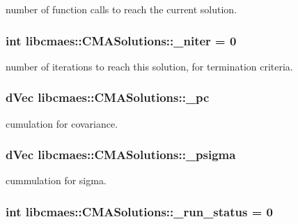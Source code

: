 number of function calls to reach the current solution. \hypertarget{classlibcmaes_1_1CMASolutions_ac4f919c1a09611ce8374edc629d3670d}{
\subsubsection[{\-\_\-niter}]{\setlength{\rightskip}{0pt plus 5cm}int libcmaes\-::\-C\-M\-A\-Solutions\-::\-\_\-niter = 0}}\label{classlibcmaes_1_1CMASolutions_ac4f919c1a09611ce8374edc629d3670d}
number of iterations to reach this solution, for termination criteria. \hypertarget{classlibcmaes_1_1CMASolutions_adc22e31da86db0140aefd132627fff74}{
\subsubsection[{\-\_\-pc}]{\setlength{\rightskip}{0pt plus 5cm}d\-Vec libcmaes\-::\-C\-M\-A\-Solutions\-::\-\_\-pc}}\label{classlibcmaes_1_1CMASolutions_adc22e31da86db0140aefd132627fff74}
cumulation for covariance. \hypertarget{classlibcmaes_1_1CMASolutions_aa39c324a7006296ee2b0c7a89713d990}{
\subsubsection[{\-\_\-psigma}]{\setlength{\rightskip}{0pt plus 5cm}d\-Vec libcmaes\-::\-C\-M\-A\-Solutions\-::\-\_\-psigma}}\label{classlibcmaes_1_1CMASolutions_aa39c324a7006296ee2b0c7a89713d990}
cummulation for sigma. \hypertarget{classlibcmaes_1_1CMASolutions_ad5b606082a773da2d5c309b3b663352a}{
\subsubsection[{\-\_\-run\-\_\-status}]{\setlength{\rightskip}{0pt plus 5cm}int libcmaes\-::\-C\-M\-A\-Solutions\-::\-\_\-run\-\_\-status = 0}}\label{classlibcmaes_1_1CMASolutions_ad5b606082a773da2d5c309b3b663352a}
